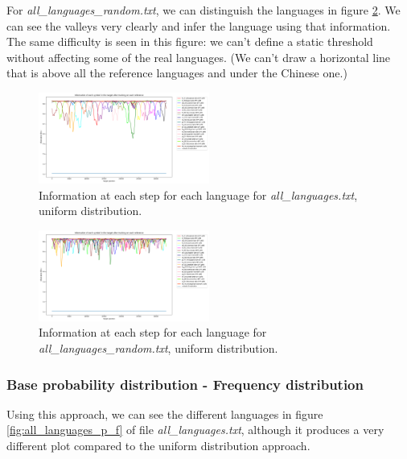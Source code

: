 \documentclass{article}
\begin{document}
For \textit{all\_languages\_random.txt}, we can distinguish the languages in figure \ref{fig:all_languages_random_p_u}.
We can see the valleys very clearly and infer the language using that information.
The same difficulty is seen in this figure: we can't define a static threshold without affecting some of the real languages.
(We can't draw a horizontal line that is above all the reference languages and under the Chinese one.)

\begin{figure}
    \centering
    \includegraphics[width=0.5\textwidth]{../results/all_languages/-p_u.png}
    \caption{Information at each step for each language for \textit{all\_languages.txt}, uniform distribution.}
    \label{fig:all_languages_p_u}
\end{figure}

\begin{figure}
    \centering
    \includegraphics[width=0.5\textwidth]{../results/all_languages_random/-p_u.png}
    \caption{Information at each step for each language for \textit{all\_languages\_random.txt}, uniform distribution.}
    \label{fig:all_languages_random_p_u}
\end{figure}

\subsubsection{Base probability distribution - Frequency distribution}
\label{subsubsec:results_locate_lang_frequency_distribution}

Using this approach, we can see the different languages in figure \ref{fig:all_languages_p_f} of file \textit{all\_languages.txt}, although it produces a very different plot
compared to the uniform distribution approach.
\end{document}
